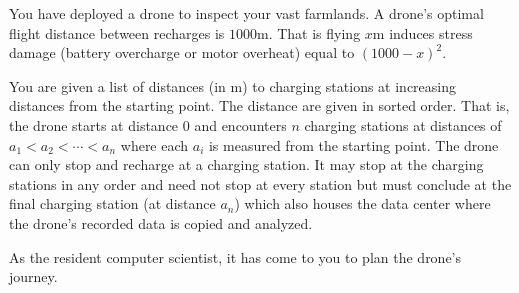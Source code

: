 \documentclass[a4paper]{exam}
\begin{document}
\begin{questions}



  You have deployed a drone to inspect your vast farmlands. A drone's optimal flight distance between recharges is $1000$m. That is flying $x$m induces stress damage (battery overcharge or motor overheat) equal to $(1000-x)^2$.

  You are given a list of distances (in m) to charging stations at increasing distances from the starting point. The distance are given in sorted order. That is, the drone starts at distance $0$ and encounters $n$ charging stations at distances of $a_1 < a_2 < \cdots < a_n$ where each $a_i$ is measured from the starting point. The drone can only stop and recharge at a charging station. It may stop at the charging stations in any order and need not stop at every station but must conclude at the final charging station (at distance $a_n$) which also houses the data center where the drone's recorded data is copied and analyzed.

  As the resident computer scientist, it has come to you to plan the drone's journey.
\end{questions}
\end{document}
